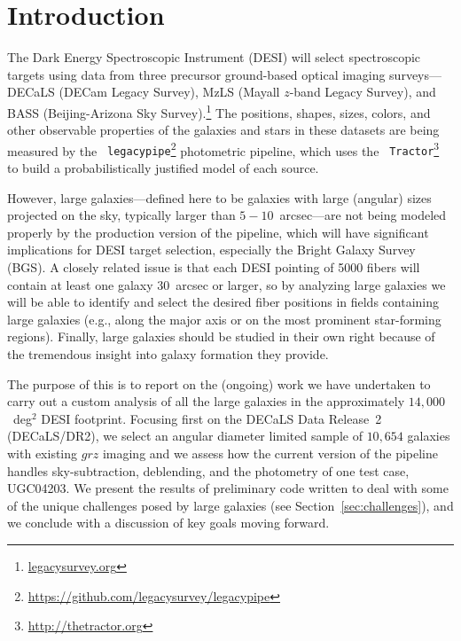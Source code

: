 \section{Introduction}\label{sec:intro}

The Dark Energy Spectroscopic Instrument (DESI) will select spectroscopic
targets using data from three precursor ground-based optical imaging
surveys---DECaLS (DECam Legacy Survey), MzLS (Mayall $z$-band Legacy Survey),
and BASS (Beijing-Arizona Sky Survey).\footnote{\url{legacysurvey.org}} The
positions, shapes, sizes, colors, and other observable properties of the
galaxies and stars in these datasets are being measured by the {\tt
  legacypipe}\footnote{\url{https://github.com/legacysurvey/legacypipe}}
photometric pipeline, which uses the {\tt
  Tractor}\footnote{\url{http://thetractor.org}} to build a probabilistically
justified model of each source.


However, large galaxies---defined here to be galaxies with large (angular) sizes
projected on the sky, typically larger than $5-10$~arcsec---are not being
modeled properly by the production version of the pipeline, which will have
significant implications for DESI target selection, especially the Bright Galaxy
Survey (BGS).  A closely related issue is that each DESI pointing of 5000 fibers
will contain at least one galaxy $30$~arcsec or larger, so by analyzing large
galaxies we will be able to identify and select the desired fiber positions in
fields containing large galaxies (e.g., along the major axis or on the most
prominent star-forming regions).  Finally, large galaxies should be studied in
their own right because of the tremendous insight into galaxy formation they
provide. 

The purpose of this \tnote{} is to report on the (ongoing) work we have
undertaken to carry out a custom analysis of all the large galaxies in the
approximately $14,000$~deg$^{2}$ DESI footprint.  Focusing first on the DECaLS
Data Release~2 (DECaLS/DR2), we select an angular diameter limited sample of
$10,654$ galaxies with existing $grz$ imaging and we assess how the current
version of the pipeline handles sky-subtraction, deblending, and the photometry
of one test case, UGC04203.  We present the results of preliminary code written
to deal with some of the unique challenges posed by large galaxies (see
Section~\ref{sec:challenges}), and we conclude with a discussion of key goals
moving forward.

